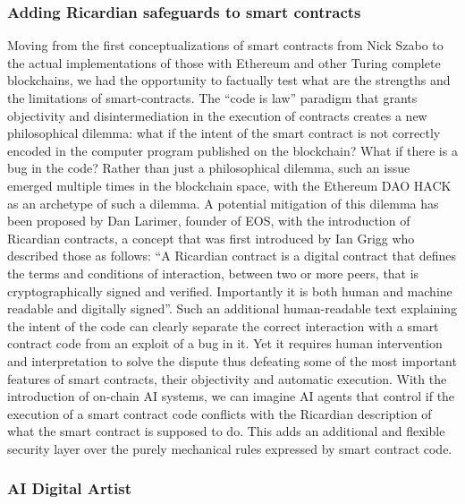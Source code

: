 \documentclass{article}
\begin{document}
\subsubsection{Adding Ricardian safeguards to smart contracts}

Moving from the first conceptualizations of smart contracts from Nick Szabo to the actual implementations of those with Ethereum and other Turing complete blockchains, we had the opportunity to factually test what are the strengths and the limitations of smart-contracts. The “code is law” paradigm that grants objectivity and disintermediation in the execution of contracts creates a new philosophical dilemma: what if the intent of the smart contract is not correctly encoded in the computer program published on the blockchain? What if there is a bug in the code? Rather than just a philosophical dilemma, such an issue emerged multiple times in the blockchain space, with the Ethereum DAO HACK as an archetype of such a dilemma. A potential mitigation of this dilemma has been proposed by Dan Larimer, founder of EOS, with the introduction of Ricardian contracts, a concept that was first introduced by Ian Grigg who described those as follows: “A Ricardian contract is a digital contract that defines the terms and conditions of interaction, between two or more peers, that is cryptographically signed and verified. Importantly it is both human and machine readable and digitally signed”. Such an additional human-readable text explaining the intent of the code can clearly separate the correct interaction with a smart contract code from an exploit of a bug in it. Yet it requires human intervention and interpretation to solve the dispute thus defeating some of the most important features of smart contracts, their objectivity and automatic execution. With the introduction of on-chain AI systems, we can imagine AI agents that control if the execution of a smart contract code conflicts with the Ricardian description of what the smart contract is supposed to do. This adds an additional and flexible security layer over the purely mechanical rules expressed by smart contract code. 


\subsubsection{AI Digital Artist}
\end{document}
